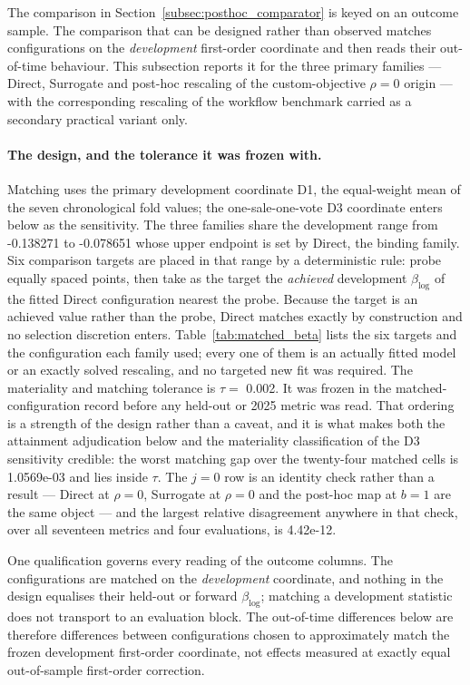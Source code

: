 \documentclass[10pt]{article}
\theoremstyle{definition}
\newcommand{\1}{\mathbf{1}}
\begin{document}
The comparison in Section~\ref{subsec:posthoc_comparator} is keyed on an outcome
sample. The comparison that can be designed rather than observed matches configurations on the
\emph{development} first-order coordinate and then reads their out-of-time behaviour. This
subsection reports it for the three primary families --- Direct, Surrogate and post-hoc rescaling of
the custom-objective $\rho=0$ origin --- with the corresponding rescaling of the workflow benchmark
carried as a secondary practical variant only.

\paragraph{The design, and the tolerance it was frozen with.}
Matching uses the primary development coordinate D1, the equal-weight mean of the seven
chronological fold values; the one-sale-one-vote D3 coordinate enters below as the sensitivity. The
three families share the development range from -0.138271 to -0.078651 whose upper endpoint is
set by Direct, the binding family. Six comparison targets are placed in that range by a
deterministic rule: probe equally spaced points, then take as the target the \emph{achieved}
development $\beta_{\log}$ of the fitted Direct configuration nearest the probe. Because the target
is an achieved value rather than the probe, Direct matches exactly by construction and no selection
discretion enters. Table~\ref{tab:matched_beta} lists the six targets and the configuration each
family used; every one of them is an actually fitted model or an exactly solved rescaling, and no
targeted new fit was required. The materiality and matching tolerance is
$\tau=$ 0.002. It was frozen in the matched-configuration record before any held-out or 2025
metric was read. That ordering is a strength of the design rather than a caveat, and it is what makes both the
attainment adjudication below and the materiality classification of the D3 sensitivity credible: the
worst matching gap over the twenty-four matched cells is 1.0569e-03 and lies inside $\tau$. The
$j=0$ row is an identity check rather than a result --- Direct at $\rho=0$, Surrogate at $\rho=0$
and the post-hoc map at $b=1$ are the same object --- and the largest relative disagreement anywhere
in that check, over all seventeen metrics and four evaluations, is 4.42e-12.

One qualification governs every reading of the outcome columns. The configurations are
matched on the \emph{development} coordinate, and nothing in the design equalises their held-out or
forward $\beta_{\log}$; matching a development statistic does not transport to an evaluation block.
The out-of-time differences below are therefore differences between configurations chosen to
approximately match the frozen development first-order coordinate, not effects measured at exactly
equal out-of-sample first-order correction.
\end{document}
